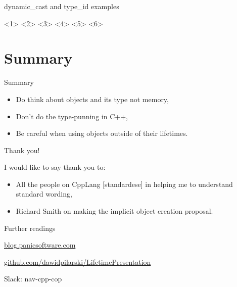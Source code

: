 \documentclass{panicsoftware-presentation}
\makeatletter
\newenvironment{itemizeSeq}{\begin{itemize}[<+-|alert@+>]}{\end{itemize}}
\makeatother
\begin{document}
\begin{frame}{dynamic\_cast and type\_id examples}

<1>
<2>
<3>
<4>
<5>
<6>


\end{frame}

\section*{Summary}

\begin{frame}{Summary}

\begin{itemizeSeq}
\item Do think about objects and its type not memory,
\item Don't do the type-punning in C++,
\item Be careful when using objects outside of their lifetimes. 
\end{itemizeSeq}

\end{frame}

\begin{frame}{Thank you!}

I would like to say thank you to:

\begin{itemize}
\item All the people on CppLang [standardese] in helping me to understand standard wording,
\item Richard Smith on making the implicit object creation proposal.
\end{itemize}

\end{frame}


\begin{frame}{Further readings}

\vfill

\centerline{\alert{\href{http://blog.panicsoftware.com}{blog.panicsoftware.com}}}

\pause
\vfill

\centerline{\alert{\href{https://github.com/dawidpilarski/LifetimePresentation}{github.com/dawidpilarski/LifetimePresentation}}}

\pause
\vfill


\centerline{\alert{Slack: nav-cpp-cop}}

\vfill

\end{frame}
\end{document}
